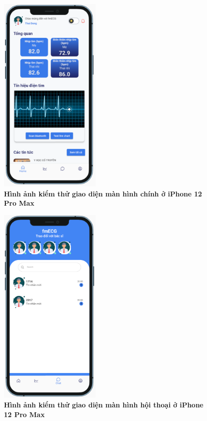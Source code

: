 \begin{figure}[H]
  \centering
  \includegraphics[width=5cm,height=10cm]{Images/mobile_app/demo/ip12_pro_max_device_preview_home_screen.png}
  \caption[Hình ảnh kiểm thử giao diện màn hình chính ở iPhone 12 Pro Max]{\bfseries \fontsize{12pt}{0pt}
  \selectfont Hình ảnh kiểm thử giao diện màn hình chính ở iPhone 12 Pro Max}
  \label{ip12_pro_max_device_preview_home_screen}
\end{figure}

\begin{figure}[H]
  \centering
  \includegraphics[width=5cm,height=10cm]{Images/mobile_app/demo/ip12_pro_max_device_preview_message.png}
  \caption[Hình ảnh kiểm thử giao diện màn hình hội thoại ở iPhone 12 Pro Max]{\bfseries \fontsize{12pt}{0pt}
  \selectfont Hình ảnh kiểm thử giao diện màn hình hội thoại ở iPhone 12 Pro Max}
  \label{ip12_pro_max_device_preview_message}
\end{figure}

